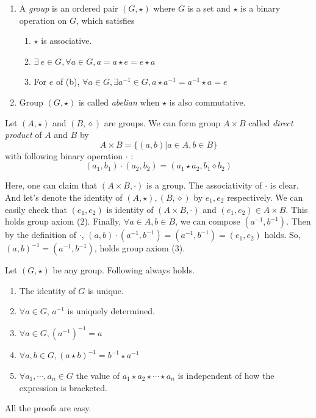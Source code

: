 \documentclass[12pt, a4paper, openany, twoside]{book}
\theoremstyle{definition}
\theoremstyle{remark}
\theoremstyle{plain}
\numberwithin{equation}{section}
\begin{document}
\begin{tcolorbox}[colback=yellow!10!white,colframe=brown!75!black,title=Group]

\begin{enumerate}
    \item A \textit{group} is an ordered pair $(G, \star)$ where $G$ is a set and $\star$ is a binary operation on $G$, which satisfies 
    \begin{enumerate}
        \item $\star$ is associative.
        \item $\exists~ e \in G, \forall a \in G, a = a \star e = e \star a$
        \item For $e$ of (b), $\forall a \in G, \exists a^{-1} \in G, a \star a^{-1} = a^{-1} \star a = e$
    \end{enumerate}
    \item Group $(G, \star)$ is called \textit{abelian} when $\star$ is also commutative. 
\end{enumerate}

\end{tcolorbox}

\begin{tcolorbox}[colback=yellow!10!white,colframe=brown!75!black,title=Direct product,breakable]
Let $(A, \star)$ and $(B, \diamond)$ are groups. We can form group $A \times B$ called \textit{direct product} of $A$ and $B$ by
\[A \times B = \{(a, b) | a \in A, b \in B\}\]
with following binary operation $\cdot$ : 
\[(a_1, b_1) \cdot (a_2, b_2) = (a_1 \star a_2, b_1 \diamond b_2)\]

Here, one can claim that $(A \times B, \cdot)$ is a group. The associativity of $\cdot$ is clear. 
And let's denote the identity of $(A, \star), (B, \diamond)$ by $e_1, e_2$ respectively. We can easily check that $(e_1, e_2)$ is identity of $(A\times B, \cdot)$
and $(e_1, e_2) \in A \times B$. This holds group axiom (2). Finally, $\forall a \in A, b \in B$, we can compose $(a^{-1}, b^{-1})$. Then by the definition of $\cdot$, 
$(a, b) \cdot (a^{-1}, b^{-1}) = (a^{-1}, b^{-1}) = (e_1, e_2)$ holds. So, $(a, b)^{-1} = (a^{-1}, b^{-1})$, holds group axiom (3). 
\end{tcolorbox}

\begin{tcolorbox}[colback=yellow!10!white,colframe=red!75!black,title=Propositions on Groups, breakable]
Let $(G, \star)$ be any group. Following always holds. 
\begin{enumerate}
    \item The identity of $G$ is unique.
    \item $\forall a \in G$, $a^{-1}$ is uniquely determined. 
    \item $\forall a \in G, (a^{-1})^{-1} = a$
    \item $\forall a, b \in G, (a \star b)^{-1} = b^{-1} \star a^{-1}$
    \item $\forall a_1, \cdots, a_n \in G$ the value of $a_1 \star a_2 \star \cdots \star a_n$ is independent of how the expression is bracketed.
\end{enumerate}

All the proofs are easy. 

\end{tcolorbox}
\end{document}
